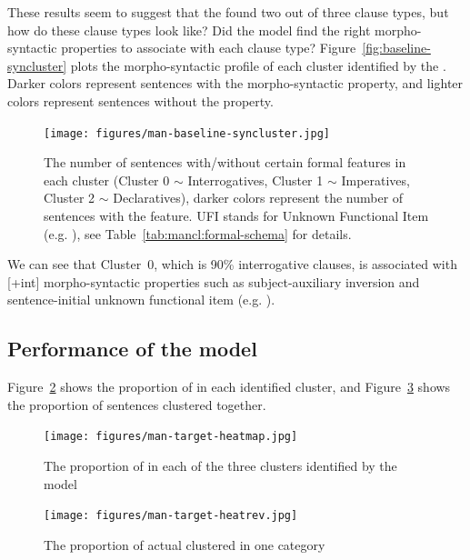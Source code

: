 These results seem to suggest that the \dlearnerabbr{} found two out of three clause types, but how do these clause types look like? Did the model find the right morpho-syntactic properties to associate with each clause type? Figure~\ref{fig:baseline-syncluster} plots the morpho-syntactic profile of each cluster identified by the \dlearnerabbr{}. Darker colors represent sentences with the morpho-syntactic property, and lighter colors represent sentences without the property. 

\begin{figure}[H]
    \centering
    \texttt{[image: figures/man-baseline-syncluster.jpg]}
    \caption{The number of sentences with/without certain formal features in each cluster (Cluster 0 $\sim$ Interrogatives, Cluster 1 $\sim$ Imperatives, Cluster 2 $\sim$ Declaratives), darker colors represent the number of sentences with the feature. UFI stands for Unknown Functional Item (e.g. \twh{}), see Table~\ref{tab:mancl:formal-schema} for details.}
    \label{fig:man-baseline-syncluster}
\end{figure}

We can see that Cluster~$0$, which is 90\% interrogative clauses, is associated with [+int] morpho-syntactic properties such as subject-auxiliary inversion and sentence-initial unknown functional item (e.g. \twh{}).

\subsection{Performance of the \plearnerabbr{} model}
\label{sec:mancl:model:results:d}

Figure~\ref{fig:man-target-heatmap} shows the proportion of \diis{} in each identified cluster, and Figure~\ref{fig:man-target-heatrev} shows the proportion of sentences clustered together. 
\begin{figure}[H]
    \centering
    \texttt{[image: figures/man-target-heatmap.jpg]}
    \caption{The proportion of \diis{} in each of the three clusters identified by the \plearnerabbr{} model}
    \label{fig:man-target-heatmap}
\end{figure}




\begin{figure}[H]
    \centering
    \texttt{[image: figures/man-target-heatrev.jpg]}
    \caption{The proportion of actual \diis{} clustered in one category}
    \label{fig:man-target-heatrev}
\end{figure}

